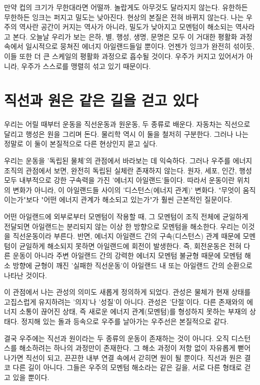 \documentclass[12pt,a4paper]{article}
\begin{document}
만약 컵의 크기가 무한대라면 어떨까. 놀랍게도 아무것도 달라지지 않는다. 유한하든 무한하든 잉크는 퍼지고 밀도는 낮아진다. 현상의 본질은 전혀 바뀌지 않는다. 나는 우주의 역사란 공간이 커지는 역사가 아니라, 밀도가 낮아지고 모멘텀이 해소되는 역사라고 본다. 오늘날 우리가 보는 은하, 별, 행성, 생명, 문명은 모두 이 거대한 평활화 과정 속에서 일시적으로 뭉쳐진 에너지 아일랜드들일 뿐이다. 언젠가 잉크가 완전히 섞이듯, 이들 또한 더 큰 스케일의 평활화 과정으로 흡수될 것이다. 우주가 커지고 있어서가 아니라, 우주가 스스로를 맹렬히 섞고 있기 때문이다.

\section{직선과 원은 같은 길을 걷고 있다}
우리는 어릴 때부터 운동을 직선운동과 원운동, 두 종류로 배운다. 자동차는 직선으로 달리고 행성은 원을 그리며 돈다. 물리학 역시 이 둘을 철저히 구분한다. 그러나 나는 정말로 이 둘이 본질적으로 다른 현상인지 묻고 싶다.

우리는 운동을 '독립된 물체'의 관점에서 바라보는 데 익숙하다. 그러나 우주를 에너지 조직의 관점에서 보면, 완전히 독립된 실체란 존재하지 않는다. 원자, 세포, 인간, 행성 모두 내부적으로 강한 구속력을 가진 '에너지 아일랜드'들이다. 따라서 운동이란 위치의 변화가 아니라, 이 아일랜드들 사이의 '디스턴스(에너지 관계)' 변화다. "무엇이 움직이는가"보다 "어떤 에너지 관계가 해소되고 있는가"가 훨씬 근본적인 질문이다.

어떤 아일랜드에 외부로부터 모멘텀이 작용할 때, 그 모멘텀이 조직 전체에 균일하게 전달되면 아일랜드는 분리되지 않는 이상 한 방향으로 모멘텀을 해소한다. 우리는 이것을 직선운동이라 부른다. 반면, 에너지 아일랜드 간의 구속(디스턴스) 관계 때문에 모멘텀이 균일하게 해소되지 못하면 아일랜드에 회전이 발생한다. 즉, 회전운동은 전혀 다른 운동이 아니라 주변 아일랜드 간의 강력한 에너지 모멘텀 불균형 때문에 모멘텀 해소 방향에 균형이 깨진 '실패한 직선운동'이 아일랜드 내 또는 아일랜드 간의 순환으로 나타난 것이다.

이 관점에서 나는 관성의 의미도 새롭게 정의하게 되었다. 관성은 물체가 현재 상태를 고집스럽게 유지하려는 '의지'나 '성질'이 아니다. 관성은 '단절'이다. 다른 존재와의 에너지 소통이 끊어진 상태, 즉 새로운 에너지 관계(모멘텀)를 형성하지 못하는 부재의 상태다. 정지해 있는 돌과 등속으로 우주를 날아가는 우주선은 본질적으로 같다.

결국 우주에는 직선과 원이라는 두 종류의 운동이 존재하는 것이 아니다. 오직 디스턴스를 해소하려는 하나의 과정만이 존재한다. 그 해소 과정이 저항 없이 자유롭게 뻗어 나가면 직선이 되고, 끈끈한 내부 연결 속에서 갇히면 원이 될 뿐이다. 직선과 원은 결코 다른 길이 아니다. 그들은 우주의 모멘텀 해소라는 같은 길을, 서로 다른 형태로 걷고 있을 뿐이다.
\end{document}
